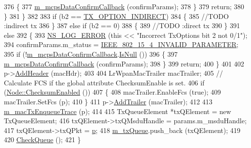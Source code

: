 \begin{DoxyCode}
376             \{
377               \hyperlink{classns3_1_1LrWpanMac_a05eba7a98d1cbbf86151290069e093e0}{m\_mcpsDataConfirmCallback} (confirmParams);
378             \}
379           \textcolor{keywordflow}{return};
380         \}
381     \}
382 
383   \textcolor{keywordflow}{if} (b2 == \hyperlink{group__lr-wpan_gga74ea891230ebf45d80d69a67266930a4a3f550efd3c932bcf500a567e30d6fa3e}{TX\_OPTION\_INDIRECT})
384     \{
385       \textcolor{comment}{//TODO :indirect tx}
386     \}
387   \textcolor{keywordflow}{else} \textcolor{keywordflow}{if} (b2 == 0)
388     \{
389       \textcolor{comment}{//TODO :direct tx}
390     \}
391   \textcolor{keywordflow}{else}
392     \{
393       \hyperlink{group__logging_ga0261a8db1d4ac5f79417d117634fd455}{NS\_LOG\_ERROR} (\textcolor{keyword}{this} << \textcolor{stringliteral}{"Incorrect TxOptions bit 2 not 0/1"});
394       confirmParams.m\_status = \hyperlink{group__lr-wpan_gga50d67c8816b2ca8da8df30d045b1b705a5c8b06d425e18155370ce481538e74de}{IEEE\_802\_15\_4\_INVALID\_PARAMETER};
395       \textcolor{keywordflow}{if} (!\hyperlink{classns3_1_1LrWpanMac_a05eba7a98d1cbbf86151290069e093e0}{m\_mcpsDataConfirmCallback}.\hyperlink{classns3_1_1Callback_aa8e27826badbf37f84763f36f70d9b54}{IsNull} ())
396         \{
397           \hyperlink{classns3_1_1LrWpanMac_a05eba7a98d1cbbf86151290069e093e0}{m\_mcpsDataConfirmCallback} (confirmParams);
398         \}
399       \textcolor{keywordflow}{return};
400     \}
401 
402   p->\hyperlink{classns3_1_1Packet_a465108c595a0bc592095cbcab1832ed8}{AddHeader} (macHdr);
403 
404   LrWpanMacTrailer macTrailer;
405   \textcolor{comment}{// Calculate FCS if the global attribute ChecksumEnable is set.}
406   \textcolor{keywordflow}{if} (\hyperlink{classns3_1_1Node_a0515bfe9a3aeb6605d657ba855699815}{Node::ChecksumEnabled} ())
407     \{
408       macTrailer.EnableFcs (\textcolor{keyword}{true});
409       macTrailer.SetFcs (p);
410     \}
411   p->\hyperlink{classns3_1_1Packet_ae26b490c30ae5bc98be5181ec6e06db8}{AddTrailer} (macTrailer);
412 
413   \hyperlink{classns3_1_1LrWpanMac_ab5d97c9ba008e159e541ec27df3480ea}{m\_macTxEnqueueTrace} (p);
414 
415   TxQueueElement *txQElement = \textcolor{keyword}{new} TxQueueElement;
416   txQElement->txQMsduHandle = params.m\_msduHandle;
417   txQElement->txQPkt = \hyperlink{lte__link__budget_8m_ac9de518908a968428863f829398a4e62}{p};
418   \hyperlink{classns3_1_1LrWpanMac_a90ea1fb2b1cec84e8ca2177772a1644d}{m\_txQueue}.push\_back (txQElement);
419 
420   \hyperlink{classns3_1_1LrWpanMac_a316c3cc9f84eeadb0b2ca249a6d0caba}{CheckQueue} ();
421 \}
\end{DoxyCode}


